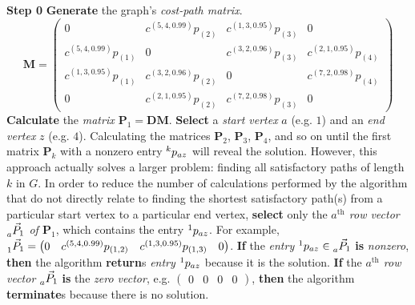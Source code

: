 \documentclass[12pt]{amsart}
\theoremstyle{definition}
\theoremstyle{remark}
\numberwithin{equation}{section}
\newcommand{\step}[1]{\noindent\textbf{Step #1}}
\begin{document}
\step{0} \textbf{Generate} the graph's \textit{cost-path matrix}.
$$
\mathbf{M} = 
\begin{pmatrix}
0 & c^{(5,4,0.99)} p_{(2)} & c^{(1,3,0.95)} p_{(3)} & 0 \\
c^{(5,4,0.99)} p_{(1)} & 0 & c^{(3,2,0.96)} p_{(3)} & c^{(2,1,0.95)} p_{(4)} \\
c^{(1,3,0.95)} p_{(1)} & c^{(3,2,0.96)} p_{(2)} & 0 & c^{(7,2,0.98)} p_{(4)} \\
0 & c^{(2,1,0.95)} p_{(2)} & c^{(7,2,0.98)} p_{(3)} & 0 \end{pmatrix}
$$
\textbf{Calculate} the \textit{matrix $\mathbf{P}_1 = \mathbf{D}\mathbf{M}$}. \textbf{Select} a \textit{start vertex} $a$ (e.g. $1$) and an \textit{end vertex} $z$ (e.g. $4$). Calculating the matrices $\mathbf{P}_2$, $\mathbf{P}_3$, $\mathbf{P}_4$, and so on until the first matrix $\mathbf{P}_k$ with a nonzero entry $\prescript{k}{}{p_{az}}$ will reveal the solution. However, this approach actually solves a larger problem: finding all satisfactory paths of length $k$ in $G$. In order to reduce the number of calculations performed by the algorithm that do not directly relate to finding the shortest satisfactory path(s) from a particular start vertex to a particular end vertex, \textbf{select} only the \textit{$a^\text{th}$ row vector $\prescript{}{a}{\vec{P}_1}$ of $\mathbf{P}_1$}, which contains the entry $\prescript{1}{}{p}_{az}$. For example, $\prescript{}{1}{\vec{P}_1} = \begin{pmatrix} 0 & c^{(5,4,0.99)} p_{(1,2)} & c^{(1,3,0.95)} p_{(1,3)} & 0 \end{pmatrix}$. \textbf{If} the \textit{entry $\prescript{1}{}{p_{az}} \in \prescript{}{a}{\vec{P}_1}$} \textbf{is} \textit{nonzero}, \textbf{then} the algorithm \textbf{return}s \textit{entry $\prescript{1}{}{p_{az}}$} because it is the solution. \textbf{If} the \textit{$a^\text{th}$ row vector $\prescript{}{a}{\vec{P}_1}$} \textbf{is} the \textit{zero vector}, e.g. $\begin{pmatrix} 0 & 0 & 0 & 0 \end{pmatrix}$, \textbf{then} the algorithm \textbf{terminate}s because there is no solution.

\hspace{1cm}
\end{document}
